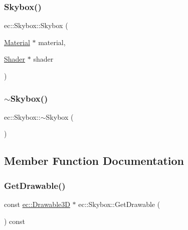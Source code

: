 \subsubsection{\texorpdfstring{Skybox()}{Skybox()}}
{\footnotesize\ttfamily ec\+::\+Skybox\+::\+Skybox (\begin{DoxyParamCaption}\item[{\mbox{\hyperlink{classec_1_1_material}{Material}} $\ast$}]{material,  }\item[{\mbox{\hyperlink{classec_1_1_shader}{Shader}} $\ast$}]{shader }\end{DoxyParamCaption})\hspace{0.3cm}{\ttfamily [explicit]}}

\mbox{\label{classec_1_1_skybox_a46b40cfaeff9de77af5a3388c35f4f9e}} 
\subsubsection{\texorpdfstring{$\sim$\+Skybox()}{~Skybox()}}
{\footnotesize\ttfamily ec\+::\+Skybox\+::$\sim$\+Skybox (\begin{DoxyParamCaption}{ }\end{DoxyParamCaption})}



\subsection{Member Function Documentation}
\mbox{\label{classec_1_1_skybox_ac635f071c2cf2187f208008d05333031}} 
\subsubsection{\texorpdfstring{Get\+Drawable()}{GetDrawable()}}
{\footnotesize\ttfamily const \mbox{\hyperlink{classec_1_1_drawable3_d}{ec\+::\+Drawable3D}} $\ast$ ec\+::\+Skybox\+::\+Get\+Drawable (\begin{DoxyParamCaption}{ }\end{DoxyParamCaption}) const}

\mbox{\label{classec_1_1_skybox_a594231bac00ce877daefa392dad1573d}} 
